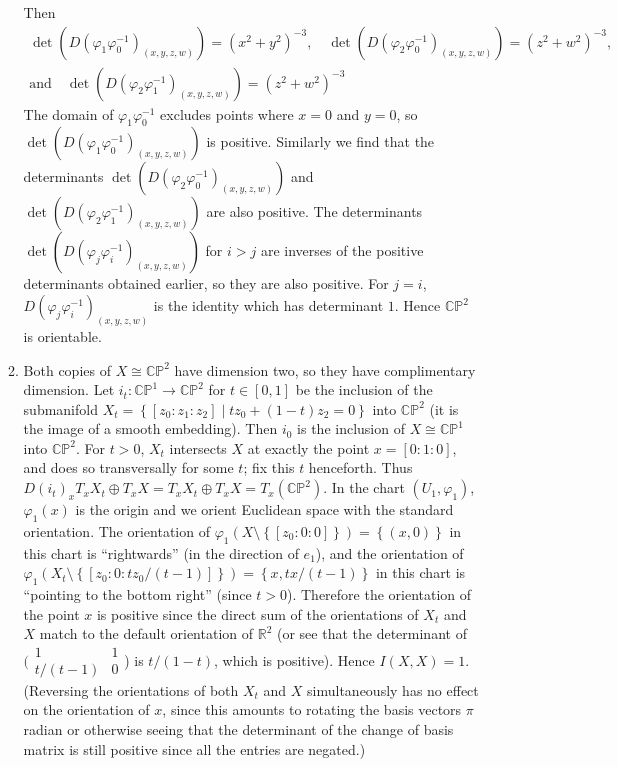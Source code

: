 \documentclass[11pt,leqno]{article}
\theoremstyle{plain}
\theoremstyle{definition}
\numberwithin{equation}{section}
\numberwithin{lem}{section}
\newcommand{\cbr}[1]{\left\{#1\right\}}
\begin{document}
\begin{enumerate}
\begin{enumerate}
      Then 
      \begin{multline*}
        \det(D(\varphi_1\varphi_0^{-1})_{(x,y,z,w)}) = (x^2+y^2)^{-3}, \quad \det(D(\varphi_2\varphi_0^{-1})_{(x,y,z,w)})= (z^2+w^2)^{-3},\\\text{and}\quad\det(D(\varphi_2\varphi_1^{-1})_{(x,y,z,w)}) = (z^2+w^2)^{-3}
      \end{multline*}
      The domain of $\varphi_1\varphi_0^{-1}$ excludes points where $x=0$ and $y=0$, so $\det(D(\varphi_1\varphi_0^{-1})_{(x,y,z,w)})$ is positive. Similarly we find that the determinants $\det(D(\varphi_2\varphi_0^{-1})_{(x,y,z,w)})$ and $\det(D(\varphi_2\varphi_1^{-1})_{(x,y,z,w)})$ are also positive. The determinants $\det(D(\varphi_j\varphi_i^{-1})_{(x,y,z,w)})$ for $i>j$ are inverses of the positive determinants obtained earlier, so they are also positive. For $j=i$, $D(\varphi_j\varphi_i^{-1})_{(x,y,z,w)}$ is the identity which has determinant $1$. Hence $\mathbb {CP}^2$ is orientable.
      \item Both copies of $X \cong \mathbb {CP}^2$ have dimension two, so they have complimentary dimension. 
      Let $i_t\colon \mathbb {CP}^1\to\mathbb {CP}^2$ for $t\in [0,1]$ be the inclusion of the submanifold $X_t = \cbr{[z_0:z_1:z_2]\mid tz_0 + (1-t)z_2 = 0}$ into $\mathbb {CP}^2$ (it is the image of a smooth embedding). Then $i_0$ is the inclusion of $X\cong \mathbb {CP}^1$ into $\mathbb {CP}^2$. For $t>0$, $X_t$ intersects $X$ at exactly the point $x=[0:1:0]$, and does so transversally for some $t$; fix this $t$ henceforth. Thus $D(i_t)_xT_xX_t\oplus T_xX = T_xX_t\oplus T_xX = T_x(\mathbb {CP}^2)$. In the chart $(U_1,\varphi_1)$, $\varphi_1(x)$ is the origin and we orient Euclidean space with the standard orientation. The orientation of $\varphi_1(X\setminus \cbr{[z_0:0:0]}) = \cbr{(x,0)}$ in this chart is ``rightwards'' (in the direction of $e_1$), and the orientation of $\varphi_1(X_t\setminus\cbr{[z_0:0:tz_0/(t-1)]}) = \cbr{x,tx/(t-1)}$ in this chart is ``pointing to the bottom right'' (since $t>0$). Therefore the orientation of the point $x$ is positive since the direct sum of the orientations of $X_t$ and $X$ match to the default orientation of $\mathbb R^2$ (or see that the determinant of $\big(\!\begin{smallmatrix}
        1 & 1 \\ t/(t-1) & 0
      \end{smallmatrix}$\!\big) is $t/(1-t)$, which is positive). Hence $I(X,X) = 1$. (Reversing the orientations of both $X_t$ and $X$ simultaneously has no effect on the orientation of $x$, since this amounts to rotating the basis vectors $\pi$ radian or otherwise seeing that the determinant of the change of basis matrix is still positive since all the entries are negated.)

\end{enumerate}
\end{enumerate}
\end{document}
